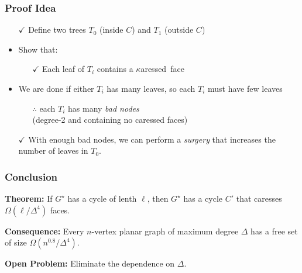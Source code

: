 \documentclass[xcolor=dvipsnames]{beamer}
\newcommand{\caressed}{$\kappa$aressed}
\newcommand{\dual}[1]{#1^\star}
\begin{document}
\begin{frame}
  \frametitle{Proof Idea}

  \begin{itemize}
    \item[$\checkmark$] Define two trees $T_0$ (inside $C$) and $T_1$ (outside $C$)
    \item Show that:
    \begin{itemize}
      \item[$\checkmark$] Each leaf of $T_i$ contains a \caressed\ face
    \end{itemize}
    \item We are done if either $T_i$ has many leaves, so each $T_i$ must have few leaves
    \begin{itemize}
      \item[$\therefore$] each $T_i$ has many \emph{bad nodes} \\ (degree-2 and containing no caressed faces)
    \end{itemize}
    \item[$\checkmark$] With enough bad nodes, we can perform a \emph{surgery} that increases the number of leaves in $T_0$.
  \end{itemize}
\end{frame}

\begin{frame}
  \frametitle{Conclusion}

  \textbf{Theorem:} If $\dual{G}$ has a cycle of lenth $\ell$, then $\dual{G}$ has a cycle $C'$ that caresses $\Omega(\ell/\Delta^4)$ faces.

  \textbf{Consequence:} Every $n$-vertex planar graph of maximum degree $\Delta$ has a free set of size $\Omega(n^{0.8}/\Delta^4)$.

  \textbf{Open Problem:} Eliminate the dependence on $\Delta$.
\end{frame}


\end{document}
